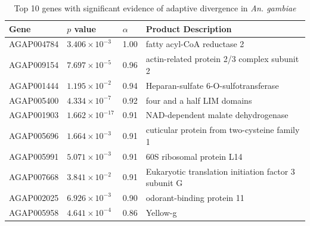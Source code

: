 \begin{table}[htp]
\centering
\begin{tabular}{@{}llll@{}}
\toprule
\textbf{Gene} & \textbf{$p$ value}    & \textbf{$\alpha$} & \textbf{Product Description}                                                                      \\ \midrule
AGAP004784    & $3.406\times10^{-3}$  & 1.00                 & fatty acyl-CoA reductase 2                                                                        \\
AGAP009154    & $7.697\times10^{-5}$  & 0.96                 & actin-related protein 2/3 complex subunit 2                                                       \\
AGAP001444    & $1.195\times10^{-2}$  & 0.94                 & Heparan-sulfate 6-O-sulfotransferase                                                              \\
AGAP005400    & $4.334\times10^{-7}$  & 0.92                 & four and a half LIM domains                                                                       \\
AGAP001903    & $1.662\times10^{-17}$ & 0.91                 & NAD-dependent malate dehydrogenase                                                                \\
AGAP005696    & $1.664\times10^{-3}$  & 0.91                 & cuticular protein from two-cysteine family 1                                                      \\
AGAP005991    & $5.071\times10^{-3}$  & 0.91                 & 60S ribosomal protein L14                                                                         \\
AGAP007668    & $3.841\times10^{-2}$  & 0.91                 & Eukaryotic translation initiation factor 3 subunit G                                              \\
AGAP002025    & $6.926\times10^{-3}$  & 0.90                 & odorant-binding protein 11                                                                        \\
AGAP005958    & $4.641\times10^{-4}$  & 0.86                 & Yellow-g                                                                                          \\ \bottomrule
\end{tabular}
\caption{Top 10 genes with significant evidence of adaptive divergence in \textit{An. gambiae}}
\label{table:gambMK}
\end{table}

